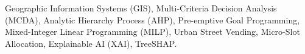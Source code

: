 \documentclass[conference]{IEEEtran}
\begin{document}
\begin{IEEEkeywords}
Geographic Information Systems (GIS), Multi-Criteria Decision Analysis (MCDA), Analytic Hierarchy Process (AHP), Pre-emptive Goal Programming, Mixed-Integer Linear Programming (MILP), Urban Street Vending, Micro-Slot Allocation, Explainable AI (XAI), TreeSHAP.
\end{IEEEkeywords}












\end{document}
